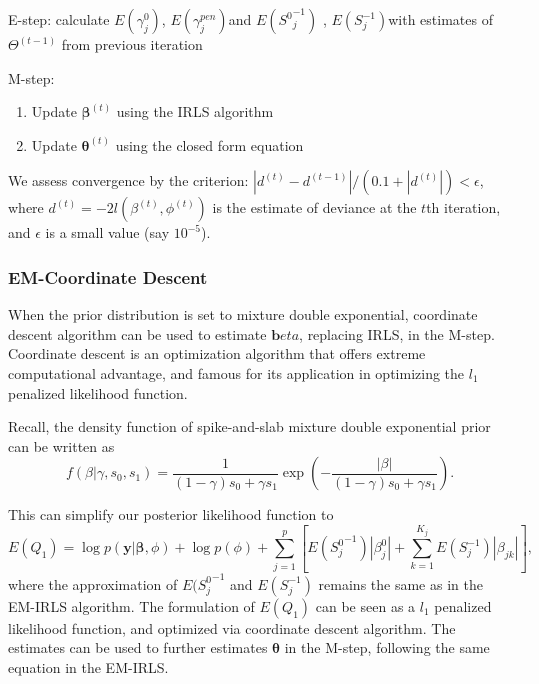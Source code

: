 \documentclass[AMA,STIX1COL,]{WileyNJD-v2}
\begin{document}
E-step: calculate \(E(\gamma^0_{j})\), \(E(\gamma^{pen}_{j})\)and
\(E({S^0}^{-1}_{j})\) , \(E({S}^{-1}_{j})\)with estimates of
\(\Theta^{(t-1)}\) from previous iteration

M-step:

\begin{enumerate}
\def\labelenumi{\alph{enumi})}
\item
  Update \(\boldsymbol{\beta}^{(t)}\) using the IRLS algorithm
\item
  Update \(\boldsymbol{\theta}^{(t)}\) using the closed form equation
\end{enumerate}

We assess convergence by the criterion:
\(|d^{(t)}-d^{(t-1)}|/(0.1+|d^{(t)}|)<\epsilon\), where
\(d^{(t)} = -2l(\beta^{(t)},\phi^{(t)})\) is the estimate of deviance at
the \(t\)th iteration, and \(\epsilon\) is a small value (say
\(10^{-5}\)).

\hfill\break

\hypertarget{em-coordinate-descent}{%
\subsubsection{EM-Coordinate Descent}\label{em-coordinate-descent}}

When the prior distribution is set to mixture double exponential,
coordinate descent algorithm can be used to estimate
\(\boldsymbol{b}eta\), replacing IRLS, in the M-step. Coordinate descent
is an optimization algorithm that offers extreme computational
advantage, and famous for its application in optimizing the \(l_1\)
penalized likelihood function.

Recall, the density function of spike-and-slab mixture double
exponential prior can be written as \[
f(\beta|\gamma, s_0, s_1) = \frac{1}{(1-\gamma)s_0 + \gamma s_1}\exp(-\frac{|\beta|}{(1-\gamma)s_0 + \gamma s_1}).
\]

This can simplify our posterior likelihood function to \[
E(Q_1) = \log p(\textbf{y}|\boldsymbol{\beta}, \phi) + \log p(\phi) + \sum\limits_{j=1}^p\left[E({S^0_j}^{-1})|\beta^0_j|+\sum\limits_{k=1}^{K_j}E(S^{-1}_{j})|\beta_{jk}|\right]
,
\] where the approximation of \(E({S^0_j}^{-1}\) and \(E(S^{-1}_{j})\)
remains the same as in the EM-IRLS algorithm. The formulation of
\(E(Q_1)\) can be seen as a \(l_1\) penalized likelihood function, and
optimized via coordinate descent algorithm. The estimates can be used to
further estimates \(\boldsymbol{\theta}\) in the M-step, following the
same equation in the EM-IRLS.
\end{document}
